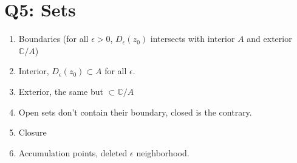 \documentclass{article}
\newtheorem{one minute paper}[theorem]{One Minute Paper}
\begin{document}
\section*{Q5: Sets}

\begin{enumerate}
    \item Boundaries (for all $\epsilon > 0$, $D_{\epsilon}(z_0)$ intersects with interior $A$ and exterior $\mathbb{C}/A$)
    \item Interior, $D_{\epsilon}(z_0) \subset A$ for all $\epsilon$. 
    \item Exterior, the same but $\subset \mathbb{C}/A$
    \item Open sets don't contain their boundary, closed is the contrary.
    \item Closure 
    \item Accumulation points, deleted $\epsilon$ neighborhood. 
\end{enumerate}
\end{document}
